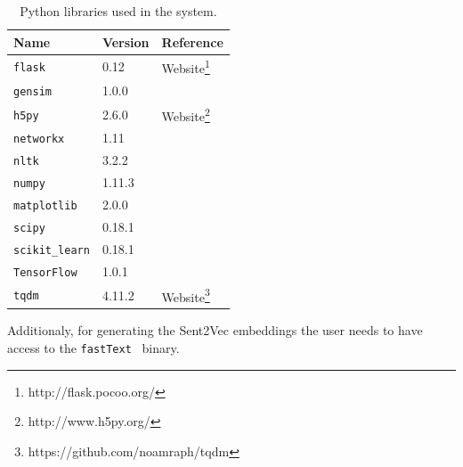 \begin{table}[H]
	\centering
	\small
	\begin{adjustbox}{max width=\textwidth}
		\begin{tabular}{lll}
			\toprule
			Name & Version & Reference \\
			\midrule
			\texttt{flask} & 0.12 & Website\protect\footnote{http://flask.pocoo.org/}\\
			\texttt{gensim} & 1.0.0 & \cite{Radim:2010}\\
			\texttt{h5py} & 2.6.0 & Website\protect\footnote{http://www.h5py.org/}\\
			\texttt{networkx} & 1.11 & \cite{Hagberg:2008}\\
			\texttt{nltk} & 3.2.2 & \cite{Bird:2009}\\
			\texttt{numpy} & 1.11.3 & \cite{Walt:2011}\\
			\texttt{matplotlib} & 2.0.0 & \cite{Hunter:2007}\\
			\texttt{scipy} & 0.18.1 & \cite{Jones:2014}\\
			\texttt{scikit\_learn} & 0.18.1 & \cite{Thidus:2016}\\
			\texttt{TensorFlow} & 1.0.1 & \cite{TensorFlow:2015}\\
			\texttt{tqdm} & 4.11.2 & Website\protect\footnote{https://github.com/noamraph/tqdm}\\
			\bottomrule
		\end{tabular}
	\end{adjustbox}
	\caption{Python libraries used in the system.}
\end{table}

Additionaly, for generating the Sent2Vec embeddings the user needs to have access to the \texttt{fastText}~\cite{Bojanowski:2016} binary.
